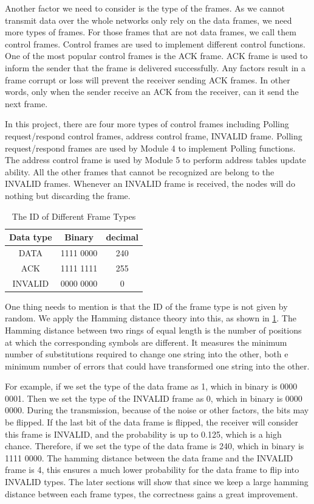 Another factor we need to consider is the type of the frames. As we cannot transmit data over the whole networks only rely on the data frames, we need more types of frames. For those frames that are not data frames, we call them control frames. Control frames are used to implement different control functions. One of the most popular control frames is the ACK frame. ACK frame is used to inform the sender that the frame is delivered successfully. Any factors result in a frame corrupt or loss will prevent the receiver sending ACK frames. In other words, only when the sender receive an ACK from the receiver, can it send the next frame. 

In this project, there are four more types of control frames including Polling request/respond control frames, address control frame, INVALID frame. Polling request/respond frames are used by Module 4 to implement Polling functions. The address control frame is used by Module 5 to perform address tables update ability. All the other frames that cannot be recognized are belong to the INVALID frames. Whenever an INVALID frame is received, the nodes will do nothing but discarding the frame. 

\begin{table}
\begin{center}
\begin{tabular}{| c | c | c |}
  \hline                       
  Data type & Binary & decimal \\
  \hline
  DATA & 1111 0000 & 240 \\
  ACK & 1111 1111 & 255\\
  INVALID & 0000 0000 & 0\\
  \hline  
\end{tabular}
\end{center}
 \caption{The ID of Different Frame Types}
	\label{tab:frametype}
\end{table}

One thing needs to mention is that the ID of the frame type is not given by random. We apply the Hamming distance theory into this, as shown in  \ref{tab:frametype}. The Hamming distance between two rings of equal length is the number of positions at which the corresponding symbols are different. It measures the minimum number of substitutions required to change one string into the other, both e minimum number of errors that could have transformed one string into the other. 

For example, if we set the type of the data frame as 1, which in binary is 0000 0001. Then we set the type of the INVALID frame as 0, which in binary is 0000 0000. During the transmission, because of the noise or other factors, the bits may be flipped. If the last bit of the data frame is flipped, the receiver will consider this frame is INVALID, and the probability is up to 0.125, which is a high chance. Therefore, if we set the type of the data frame is 240, which in binary is 1111 0000. The hamming distance between the data frame and the INVALID frame is 4, this ensures a much lower probability for the data frame to flip into INVALID types. The later sections will show that since we keep a large hamming distance between each frame types, the correctness gains a great improvement. 


